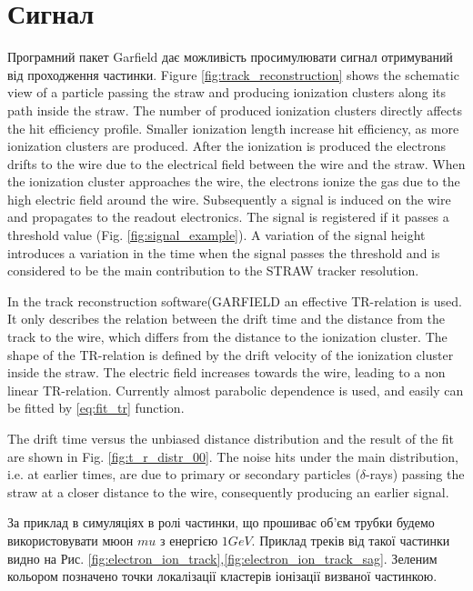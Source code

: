 \documentclass[]{article}
\begin{document}
	\section{Сигнал}	
	Програмний пакет Garfield дає можливість просимулювати сигнал отримуваний від проходження частинки. 
	Figure \ref{fig:track_reconstruction} shows the schematic view of a particle passing the straw and producing ionization clusters along its path inside the straw. The number of produced ionization clusters directly affects the hit efficiency profile. \cite{kozlinskiy} Smaller ionization length increase hit efficiency, as more ionization clusters are produced.  After the ionization is produced the electrons drifts to the wire due to the electrical field between the wire and the straw. When the ionization cluster approaches the wire, the electrons ionize the gas due to the high electric field around the wire.  Subsequently a signal is induced on the wire and propagates to the readout electronics. The signal is registered if it passes a threshold value (Fig. \ref{fig:signal_example}). A variation of the signal height introduces a variation in the time when the
signal passes the threshold and is considered to be the main contribution to the STRAW tracker resolution. 

	In the track reconstruction software(GARFIELD \cite{garfield} an effective TR-relation is used. It only describes the relation between the drift time and the distance from the track to the wire, which differs from the distance to the ionization cluster. The shape of the TR-relation is defined by the drift velocity of the ionization cluster inside the straw. The electric field increases towards the wire, leading to a non linear TR-relation. Currently almost parabolic dependence is used, and easily can be fitted by \ref{eq:fit_tr} function.

	The drift time versus the unbiased distance distribution and the result of the fit are shown in Fig. \ref{fig:t_r_distr_00}. The noise hits under the main distribution, i.e. at earlier times, are due to primary or secondary particles ($\delta$-rays) passing the straw at a closer distance to the wire, consequently producing an earlier signal.
	
	За приклад в симуляціях в ролі частинки, що прошиває об’єм трубки будемо використовувати мюон $mu$ з енергією $1GeV$. Приклад треків від такої частинки видно на Рис. \ref{fig:electron_ion_track},\ref{fig:electron_ion_track_sag}. Зеленим кольором позначено точки локалізації кластерів іонізації визваної частинкою.
	
\end{document}
